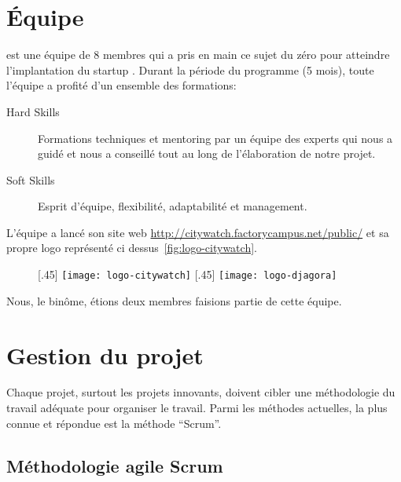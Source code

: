 \section{Équipe }

 est une équipe de 8 membres qui a pris en main ce sujet
du zéro pour atteindre l'implantation du startup .
Durant la période du programme (5 mois), toute l'équipe a profité d'un ensemble
des formations:

\begin{description}
 \item [Hard Skills] Formations techniques et mentoring par un équipe des
     experts qui nous a guidé et nous a conseillé tout au long de l'élaboration
     de notre projet.
 \item [Soft Skills] Esprit d'équipe, flexibilité, adaptabilité et management.
\end{description}

L'équipe a lancé son site web \url{http://citywatch.factorycampus.net/public/}
et sa propre logo représenté ci dessus~\ref{fig:logo-citywatch}.

\begin{figure}[htbp]
    \centering
    [.45\linewidth]
    {\texttt{[image: logo-citywatch]}}
    [.45\linewidth]
    {\texttt{[image: logo-djagora]}}
    \caption[Logos du  et ]{}
\end{figure}

Nous, le binôme, étions deux membres faisions partie de cette équipe.

\section{Gestion du projet }

Chaque projet, surtout les projets innovants, doivent cibler une méthodologie
du travail adéquate pour organiser le travail. Parmi les méthodes actuelles, la
plus connue et répondue est la méthode ``Scrum''.

\subsection{Méthodologie agile Scrum}

